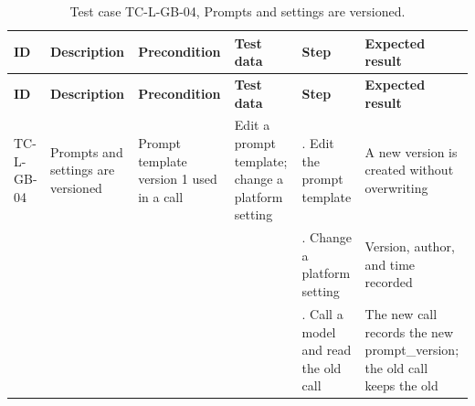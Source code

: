 {\footnotesize{}\renewcommand{\arraystretch}{1.1}
\begin{longtable}{|>{\raggedright\arraybackslash}p{}|>{\raggedright\arraybackslash}p{}|>{\raggedright\arraybackslash}p{}|>{\raggedright\arraybackslash}p{}|>{\raggedright\arraybackslash}p{}|>{\raggedright\arraybackslash}p{}|}
\caption{Test case TC-L-GB-04, Prompts and settings are versioned.} \\
\hline
\textbf{ID} & \textbf{Description} & \textbf{Precondition} & \textbf{Test data} & \textbf{Step} & \textbf{Expected result} \\ \hline
\endfirsthead
\hline
\textbf{ID} & \textbf{Description} & \textbf{Precondition} & \textbf{Test data} & \textbf{Step} & \textbf{Expected result} \\ \hline
\endhead
TC-L-GB-04 & Prompts and settings are versioned & Prompt template version 1 used in a call & Edit a prompt template; change a platform setting & 1. Edit the prompt template & A new version is created without overwriting \\ \cline{5-6}
 &  &  &  & 2. Change a platform setting & Version, author, and time recorded \\ \cline{5-6}
 &  &  &  & 3. Call a model and read the old call & The new call records the new prompt\_\allowbreak{}version; the old call keeps the old \\ \hline
\end{longtable}
}

